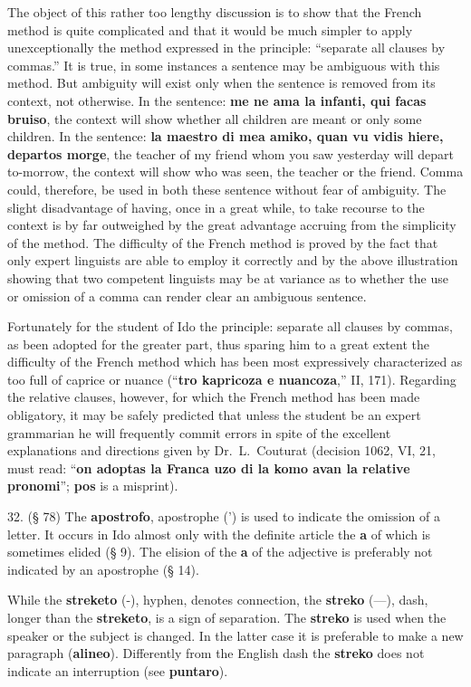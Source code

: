 The object of this rather too lengthy discussion is to show that the French method is quite complicated and that it would be much simpler to apply unexceptionally the method expressed in the principle: ``separate all clauses by commas.'' It is true, in some instances a sentence may be ambiguous with this method. But ambiguity will exist only when the sentence is removed from its context, not otherwise. In the sentence: \textbf{me ne ama la infanti, qui facas bruiso}, the context will show whether all children are meant or only some children. In the sentence: \textbf{la maestro di mea amiko, quan vu vidis hiere, departos morge}, the teacher of my friend whom you saw yesterday will depart to-morrow, the context will show who was seen, the teacher or the friend. Comma could, therefore, be used in both these sentence without fear of ambiguity. The slight disadvantage of having, once in a great while, to take recourse to the context is by far outweighed by the great advantage accruing from the simplicity of the method. The difficulty of the French method is proved by the fact that only expert linguists are able to employ it correctly and by the above illustration showing that two competent linguists may be at variance as to whether the use or omission of a comma can render clear an ambiguous sentence.

Fortunately for the student of Ido the principle: separate all clauses by commas, as been adopted for the greater part, thus sparing him to a great extent the difficulty of the French method which has been most expressively characterized as too full of caprice or nuance (``\textbf{tro kapricoza e nuancoza},'' II, 171). Regarding the relative clauses, however, for which the French method has been made obligatory, it may be safely predicted that unless the student be an expert grammarian he will frequently commit errors in spite of the excellent explanations and directions given by Dr.~L.~Couturat (decision 1062, VI, 21, must read: ``\textbf{on adoptas la Franca uzo di la komo avan la relative pronomi}''; \textbf{pos} is a misprint).

32. (§ 78) The \textbf{apostrofo}, apostrophe (') is used to indicate the omission of a letter. It occurs in Ido almost only with the definite article the \textbf{a} of which is sometimes elided (§ 9). The elision of the \textbf{a} of the adjective is preferably not indicated by an apostrophe (§ 14). %

While the \textbf{streketo} (-), hyphen, denotes connection, the \textbf{streko} (—), dash, longer than the \textbf{streketo}, is a sign of separation. The \textbf{streko} is used when the speaker or the subject is changed. In the latter case it is preferable to make a new paragraph (\textbf{alineo}). Differently from the English dash the \textbf{streko} does not indicate an interruption (see \textbf{puntaro}).

